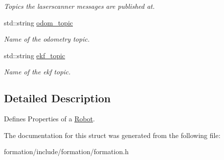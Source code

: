\begin{DoxyCompactItemize}
\begin{DoxyCompactList}\small\item\em Topics the laserscanner messages are published at. \end{DoxyCompactList}\item 
std\+::string \hyperlink{structFormation_1_1RobotProperties_a23922628a06ebf33073ce00dd853b6ba}{odom\+\_\+topic}\hypertarget{structFormation_1_1RobotProperties_a23922628a06ebf33073ce00dd853b6ba}{}\label{structFormation_1_1RobotProperties_a23922628a06ebf33073ce00dd853b6ba}

\begin{DoxyCompactList}\small\item\em Name of the odometry topic. \end{DoxyCompactList}\item 
std\+::string \hyperlink{structFormation_1_1RobotProperties_a6b597cb09fe46f80f22853fcaf44bcae}{ekf\+\_\+topic}\hypertarget{structFormation_1_1RobotProperties_a6b597cb09fe46f80f22853fcaf44bcae}{}\label{structFormation_1_1RobotProperties_a6b597cb09fe46f80f22853fcaf44bcae}

\begin{DoxyCompactList}\small\item\em Name of the ekf topic. \end{DoxyCompactList}\end{DoxyCompactItemize}


\subsection{Detailed Description}
Defines Properties of a \hyperlink{structFormation_1_1Robot}{Robot}. 

The documentation for this struct was generated from the following file\+:\begin{DoxyCompactItemize}
\item 
formation/include/formation/formation.\+h\end{DoxyCompactItemize}
